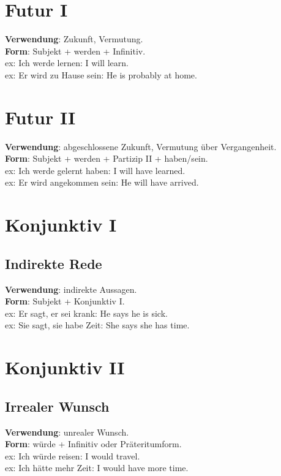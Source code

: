 \documentclass[a4paper]{article}
\begin{document}
    
    \section{Futur I}
        \textbf{Verwendung}: Zukunft, Vermutung.\\
        \textbf{Form}: Subjekt + werden + Infinitiv.\\
        ex: Ich werde lernen: I will learn.\\
        ex: Er wird zu Hause sein: He is probably at home.\\
    
    
    \section{Futur II}
        \textbf{Verwendung}: abgeschlossene Zukunft, Vermutung über Vergangenheit.\\
        \textbf{Form}: Subjekt + werden + Partizip II + haben/sein.\\
        ex: Ich werde gelernt haben: I will have learned.\\
        ex: Er wird angekommen sein: He will have arrived.\\
    
    
    \section{Konjunktiv I}
        
        \subsection{Indirekte Rede}
            \textbf{Verwendung}: indirekte Aussagen.\\
            \textbf{Form}: Subjekt + Konjunktiv I.\\
            ex: Er sagt, er sei krank: He says he is sick.\\
            ex: Sie sagt, sie habe Zeit: She says she has time.\\
    
    
    \section{Konjunktiv II}
        
        \subsection{Irrealer Wunsch}
            \textbf{Verwendung}: unrealer Wunsch.\\
            \textbf{Form}: würde + Infinitiv oder Präteritumform.\\
            ex: Ich würde reisen: I would travel.\\
            ex: Ich hätte mehr Zeit: I would have more time.\\
        
\end{document}
